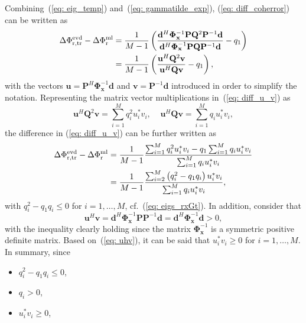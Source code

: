 \documentclass[10pt]{IEEEtran}
\begin{document}
Combining~(\ref{eq: eig_temp}) and~(\ref{eq: gammatilde_exp}), (\ref{eq: diff_coherror}) can be written as
\begin{align}
\Delta \Phi^{\rm evd}_{\rm r,tr} - \Delta \Phi^{\rm ml}_{\rm r}  & = \frac{1}{M-1} \left( \frac{\mathbf{d}^H\mathbf{\Phi}^{-1}_{\mathbf{x}} \mathbf{P} \mathbf{Q}^2 \mathbf{P}^{-1}\mathbf{d}}{\mathbf{d}^H \mathbf{\Phi}^{-1}_{\mathbf{x}}\mathbf{P} \mathbf{Q} \mathbf{P}^{-1} \mathbf{d}} - q_1  \right) \\
\label{eq: diff_u_v}
& = \frac{1}{M-1} \left( \frac{\mathbf{u}^H \mathbf{Q}^2\mathbf{v}}{\mathbf{u}^H\mathbf{Q}\mathbf{v}}  - q_1 \right),
\end{align}
with the vectors $\mathbf{u} = \mathbf{P}^H \mathbf{\Phi}^{-1}_{\mathbf{x}}\mathbf{d}$ and $\mathbf{v} = \mathbf{P}^{-1}\mathbf{d}$ introduced in order to simplify the notation.
Representing the matrix vector multiplications in~(\ref{eq: diff_u_v}) as
\begin{equation}
\mathbf{u}^H \mathbf{Q}^2\mathbf{v} = \sum_{i = 1}^M q^2_i u^{*}_i v_i, \; \; \; \; \mathbf{u}^H \mathbf{Q}\mathbf{v} = \sum_{i = 1}^M q_i u^{*}_i v_i, 
\end{equation}
the difference in (\ref{eq: diff_u_v}) can be further written as
\begin{align}
\Delta \Phi^{\rm evd}_{\rm r,tr} - \Delta \Phi^{\rm ml}_{\rm r} &= \frac{1}{M-1} \frac{\sum_{i = 1}^M q^2_i u^{*}_i v_i - q_1 \sum_{i = 1}^M q_i u^{*}_i v_i}{\sum_{i = 1}^M q_i u^{*}_i v_i} \\
& = \frac{1}{M-1} \frac{\sum_{i = 2}^M \left( q_i^2 - q_1q_i \right) u^{*}_i v_i}{\sum_{i = 1}^M q_i u^{*}_i v_i},
\end{align}
with $q_i^2 - q_1q_i \leq 0$ for $i = 1, \ldots, M$, cf.~(\ref{eq: eigs_rxGt}).
In addition, consider that
\begin{equation}
\label{eq: uhv}
\mathbf{u}^H\mathbf{v} = \mathbf{d}^H\mathbf{\Phi}^{-1}_{\mathbf{x}} \mathbf{P} \mathbf{P}^{-1}\mathbf{d} = \mathbf{d}^H\mathbf{\Phi}^{-1}_{\mathbf{x}}\mathbf{d} > 0,
\end{equation}
with the inequality clearly holding since the matrix $\mathbf{\Phi}^{-1}_{\mathbf{x}}$ is a symmetric positive definite matrix.
Based on~(\ref{eq: uhv}), it can be said that $u^*_iv_i \geq 0$ for $i = 1, \ldots, M$.
In summary, since
\begin{itemize}
\item $q_i^2 - q_1q_i \leq 0$, 
\item $q_i > 0$, 
\item $u^*_iv_i \geq 0$,
\end{itemize}
\end{document}
